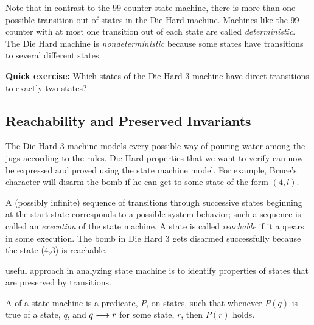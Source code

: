 \begin{example}
Note that in contrast to the 99-counter state machine, there is more than
one possible transition out of states in the Die Hard machine.  Machines
like the 99-counter with at most one transition out of each state are
called \emph{deterministic}.  The Die Hard machine is
\emph{nondeterministic} because some states have transitions to several
different states.

\textbf{Quick exercise:} Which states of the Die Hard 3 machine have
direct transitions to exactly two states?

\end{example}

\subsection{Reachability and Preserved Invariants}

The Die Hard 3 machine models every possible way of pouring water among
the jugs according to the rules.  Die Hard properties that we want to
verify can now be expressed and proved using the state machine model.  For
example, Bruce's character will disarm the bomb if he can get to some
state of the form $(4, l)$.

A (possibly infinite) sequence of transitions through successive states
beginning at the start state corresponds to a possible system behavior;
such a sequence is called an \emph{execution} of the state machine.  A
state is called \emph{reachable} if it appears in some execution.  The
bomb in Die Hard 3 gets disarmed successfully because the state (4,3) is
reachable.

 useful approach in analyzing state
machine is to identify properties of states that are preserved by
transitions.  

\begin{definition}
  A  of a state machine is a predicate, $P$, on
  states, such that whenever $P(q)$ is true of a state, $q$, and $q
  \mathrel{\longrightarrow} r$ for some state, $r$, then $P(r)$ holds.
\end{definition}


